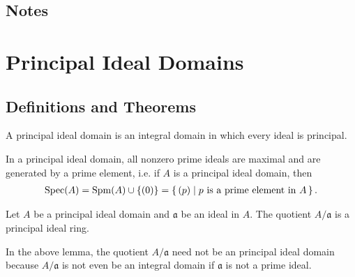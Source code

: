 \subsection*{Notes}

\newpage
\section{Principal Ideal Domains}
\subsection*{Definitions and Theorems}

\begin{defbox}
    \begin{definition}
        A principal ideal domain is an integral domain in which every ideal is principal.
    \end{definition}
\end{defbox}

\begin{thmbox}
    \begin{lemma}
        In a principal ideal domain, all nonzero prime ideals are maximal and are generated by a prime element, i.e. if \(A\) is a principal ideal domain, then
        \begin{align*}
            \mathrm{Spec}(A) = \mathrm{Spm}(A) \cup \{(0)\} = \left\{\, (p) \mid p \text{ is a prime element in } A \,\right\} \text{.}
        \end{align*}
    \end{lemma}
\end{thmbox}

\begin{thmbox}
    \begin{lemma}
        Let \(A\) be a principal ideal domain and \(\mathfrak{a}\) be an ideal in \(A\). The quotient \(A/\mathfrak{a}\) is a principal ideal ring.
    \end{lemma}
\end{thmbox}

\begin{rembox}
    \begin{remark}
        In the above lemma, the quotient \(A / \mathfrak{a}\) need not be an principal ideal domain because \(A / \mathfrak{a}\) is not even be an integral domain if \(\mathfrak{a}\) is not a prime ideal.
    \end{remark}
\end{rembox}

